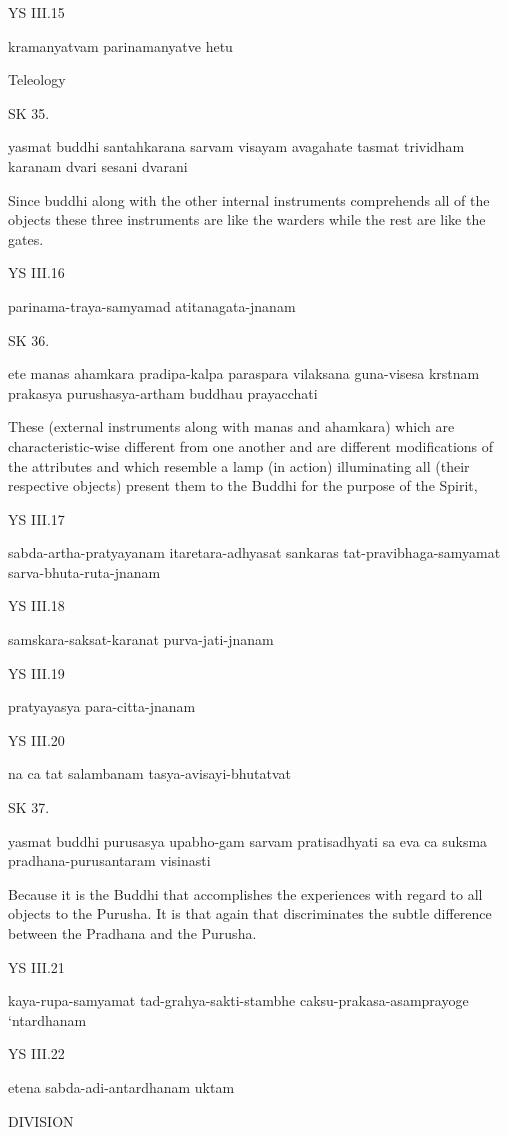 YS III.15

kramanyatvam parinamanyatve hetu

Teleology

SK 35.


yasmat buddhi santahkarana sarvam visayam avagahate
tasmat trividham karanam dvari sesani dvarani

Since buddhi along with the other internal instruments
comprehends all of the objects these three instruments are
like the warders while the rest are like the gates.

YS III.16

parinama-traya-samyamad atitanagata-jnanam

SK 36.

ete manas ahamkara pradipa-kalpa paraspara vilaksana
guna-visesa krstnam prakasya purushasya-artham buddhau prayacchati

These (external instruments along with manas and ahamkara)
which are characteristic-wise different from one another
and are different modifications of the attributes
and which resemble a lamp (in action) illuminating all (their respective objects)
present them to the Buddhi for the purpose of the Spirit,

YS III.17

sabda-artha-pratyayanam itaretara-adhyasat sankaras tat-pravibhaga-samyamat sarva-bhuta-ruta-jnanam

YS III.18

samskara-saksat-karanat purva-jati-jnanam

YS III.19

pratyayasya para-citta-jnanam

YS III.20

na ca tat salambanam tasya-avisayi-bhutatvat

SK 37.

yasmat buddhi purusasya upabho-gam sarvam pratisadhyati
sa eva ca suksma pradhana-purusantaram visinasti

Because it is the Buddhi that accomplishes the experiences
with regard to all objects to the Purusha.
It is that again that discriminates the subtle difference
between the Pradhana and the Purusha.

YS III.21

kaya-rupa-samyamat tad-grahya-sakti-stambhe caksu-prakasa-asamprayoge ‘ntardhanam

YS III.22

etena sabda-adi-antardhanam uktam

DIVISION

